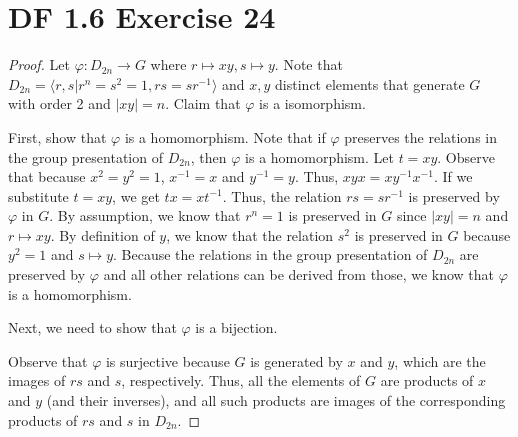 \documentclass{article}
\begin{document}
\section{DF 1.6 Exercise 24}
\begin{proof}
Let $\varphi: D_{2n} \rightarrow G$ where $r \mapsto xy, s \mapsto y$. Note that $D_{2n} = \langle r, s | r^n = s^2 = 1, rs=sr^{-1} \rangle$ and $x,y$ distinct elements that generate $G$ with order 2 and $|xy|=n$. Claim that $\varphi$ is a isomorphism.

First, show that $\varphi$ is a homomorphism. Note that if $\varphi$ preserves the relations in the group presentation of $D_{2n}$, then $\varphi$ is a homomorphism. Let $t=xy$. Observe that because $x^2=y^2=1$, $x^{-1} = x$ and $y^{-1}=y$. Thus, $xyx=xy^{-1}x^{-1}$. If we substitute $t=xy$, we get $tx=xt^{-1}$. Thus, the relation $rs=sr^{-1}$ is preserved by $\varphi$ in $G$. By assumption, we know that $r^n=1$ is preserved in $G$ since $|xy|=n$ and $r \mapsto xy$. By definition of $y$, we know that the relation $s^2$ is preserved in $G$ because $y^2=1$ and $s \mapsto y$. Because the relations in the group presentation of $D_{2n}$ are preserved by $\varphi$ and all other relations can be derived from those, we know that $\varphi$ is a homomorphism.

Next, we need to show that $\varphi$ is a bijection. 

Observe that $\varphi$ is surjective because $G$ is generated by $x$ and $y$, which are the images of $rs$ and $s$, respectively. Thus, all the elements of $G$ are products of $x$ and $y$ (and their inverses), and all such products are images of the corresponding products of $rs$ and $s$ in $D_{2n}$.


\end{proof}
\end{document}
